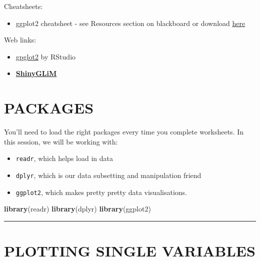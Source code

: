 \documentclass[
]{book}
\newenvironment{Shaded}{\begin{snugshade}}{\end{snugshade}}
\newcommand{\KeywordTok}[1]{\textcolor[rgb]{0.13,0.29,0.53}{\textbf{#1}}}
\newcommand{\NormalTok}[1]{#1}
\providecommand{\tightlist}{%
  \setlength{\itemsep}{0pt}\setlength{\parskip}{0pt}}
\begin{document}
Cheatsheets:

\begin{itemize}
\tightlist
\item
  ggplot2 cheatsheet - see Resources section on blackboard or
  download \href{https://rstudio.com/wp-content/uploads/2015/03/ggplot2-cheatsheet.pdf}{here}
  ~
\end{itemize}

Web links:

\begin{itemize}
\item
  \href{https://ggplot2.tidyverse.org/}{gpglot2} by RStudio\\
  \hspace*{0.333em}
\item
  \href{https://iainmstott.shinyapps.io/ShinyGLiM}{\textbf{ShinyGLiM}}\\
\end{itemize}

\hypertarget{packages}{%
\section{PACKAGES}\label{packages}}

You'll need to load the right packages every time you complete worksheets. In
this session, we will be working with:

\begin{itemize}
\tightlist
\item
  \texttt{readr}, which helps load in data
\item
  \texttt{dplyr}, which is our data subsetting and manipulation friend
\item
  \texttt{ggplot2}, which makes pretty pretty data visualisations.
\end{itemize}

\begin{Shaded}
\begin{Highlighting}[]
\KeywordTok{library}\NormalTok{(readr)}
\KeywordTok{library}\NormalTok{(dplyr)}
\KeywordTok{library}\NormalTok{(ggplot2)}
\end{Highlighting}
\end{Shaded}

\begin{center}\rule{0.5\linewidth}{0.5pt}\end{center}

\hypertarget{plotting-single-variables}{%
\section{PLOTTING SINGLE VARIABLES}\label{plotting-single-variables}}
\end{document}
